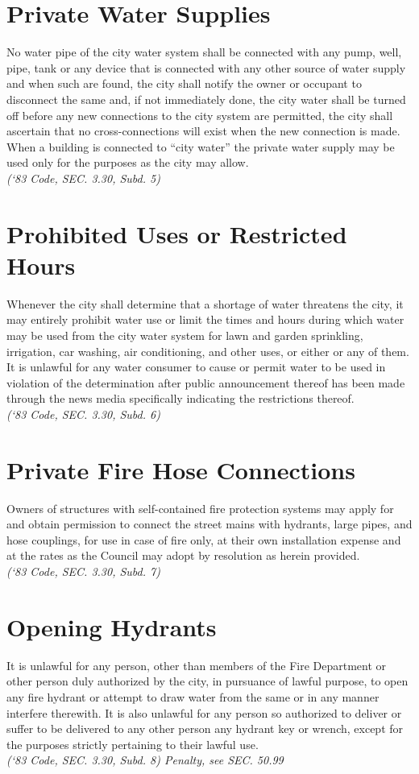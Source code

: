 \section{Private Water Supplies}
No water pipe of the city water system shall be connected with any pump, well, pipe, tank or any device that is connected with any other source of water supply and when such are found, the city shall notify the owner or occupant to disconnect the same and, if not immediately done, the city water shall be turned off before any new connections to the city system are permitted, the city shall ascertain that no cross-connections will exist when the new connection is made. When a building is connected to “city water” the private water supply may be used only for the purposes as the city may allow.\\
\emph{(‘83 Code, SEC. 3.30, Subd. 5)}
\section{Prohibited Uses or Restricted Hours}
Whenever the city shall determine that a shortage of water threatens the city, it may entirely prohibit water use or limit the times and hours during which water may be used from the city water system for lawn and garden sprinkling, irrigation, car washing, air conditioning, and other uses, or either or any of them.  It is unlawful for any water consumer to cause or permit water to be used in violation of the determination after public announcement thereof has been made through the news media specifically indicating the restrictions thereof.\\
\emph{(‘83 Code, SEC. 3.30, Subd. 6)}
\section{Private Fire Hose Connections}
Owners of structures with self-contained fire protection systems may apply for and obtain permission to connect the street mains with hydrants, large pipes, and hose couplings, for use in case of fire only, at their own installation expense and at the rates as the Council may adopt by resolution as herein provided.\\
\emph{(‘83 Code, SEC. 3.30, Subd. 7)}
\section{Opening Hydrants}
It is unlawful for any person, other than members of the Fire Department or other person duly authorized by the city, in pursuance of lawful purpose, to open any fire hydrant or attempt to draw water from the same or in any manner interfere therewith.  It is also unlawful for any person so authorized to deliver or suffer to be delivered to any other person any hydrant key or wrench, except for the purposes strictly pertaining to their lawful use.\\
\emph{(‘83 Code, SEC. 3.30, Subd. 8)  Penalty, see SEC. 50.99}
